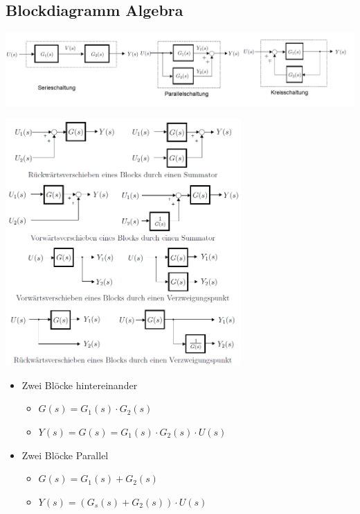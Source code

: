 \subsection{Blockdiagramm Algebra}
\begin{center}
	\includegraphics[width=16cm]{./images/blockdiagrammAlgebra.png}
\end{center}
\vspace{-1cm}\begin{multicols}{2}
\begin{center}
\includegraphics[width=9cm]{./images/blockdiagrammAlgebra2.png}
\end{center}

\columnbreak

\begin{itemize}
\item Zwei Blöcke hintereinander 
\begin{itemize}
	\item $G(s)=G_1(s)\cdot G_2(s)$
	\item $Y(s) = G(s)=G_1(s)\cdot G_2(s) \cdot U(s)$
\end{itemize}
\item Zwei Blöcke Parallel
\begin{itemize}
	\item $G(s) = G_1(s) + G_2(s)$
	\item $Y(s)= (G_s(s)+G_2(s))\cdot U(s)$
\end{itemize}


\end{itemize}
\end{multicols}
